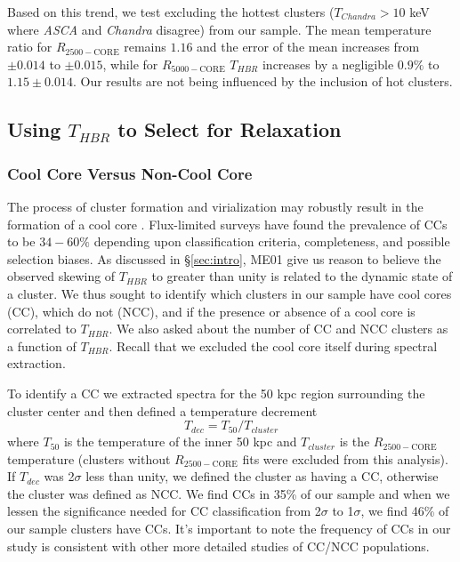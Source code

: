 \documentclass{emulateapj}
\begin{document}
Based on this trend, we test excluding the hottest clusters
($T_{Chandra} > 10$ keV where {\it ASCA} and {\it Chandra} disagree) from our sample.
The mean temperature ratio for $R_{2500-\mathrm{CORE}}$ remains $1.16$ and the error
of the mean increases from $\pm 0.014$ to $\pm 0.015$, while for $R_{5000-\mathrm{CORE}}$
$T_{HBR}$ increases by a negligible $0.9\%$ to $1.15\pm 0.014$. Our results
are not being influenced by the inclusion of hot clusters.

\subsection{Using $T_{HBR}$ to Select for Relaxation} \label{sec:relax}

\subsubsection{Cool Core Versus Non-Cool Core}\label{sec:ccncc}

The process of cluster formation and virialization may robustly result
in the formation of a cool core
\citep{2006ApJ...640..673O,2007arXiv0708.1954B}. Flux-limited surveys
have found the prevalence of CCs to be $34-60\%$ \citep{1997MNRAS.292..419W,
1998MNRAS.298..416P, 2005MNRAS.359.1481B, 2007A&A...466..805C}
depending upon classification criteria, completeness, and possible
selection biases. As discussed in \S\ref{sec:intro}, ME01 give us
reason to believe the observed skewing of $T_{HBR}$ to greater than unity is
related to the dynamic state of a cluster. We thus sought to identify
which clusters in our sample have cool cores (CC), which do not (NCC),
and if the presence or absence of a cool core is correlated to $T_{HBR}$. We
also asked about the number of CC and NCC clusters as a function of
$T_{HBR}$. Recall that we excluded the cool core itself during spectral
extraction.

To identify a CC we extracted spectra for the 50 kpc region
surrounding the cluster center and then defined a temperature
decrement 
\begin{equation}
T_{dec} = T_{50}/T_{cluster}
\label{eqn:tdec}
\end{equation}
where $T_{50}$ is the temperature of the inner 50 kpc and
$T_{cluster}$ is the $R_{2500-\mathrm{CORE}}$ temperature (clusters
without $R_{2500-\mathrm{CORE}}$ fits were excluded from this
analysis). If $T_{dec}$ was 2$\sigma$ less than unity, we defined the
cluster as having a CC, otherwise the cluster was defined as NCC. We
find CCs in 35\% of our sample and when we lessen the significance
needed for CC classification from 2$\sigma$ to 1$\sigma$, we find 46\%
of our sample clusters have CCs. It's important to note the frequency
of CCs in our study is consistent with other more detailed studies of
CC/NCC populations.
\end{document}
